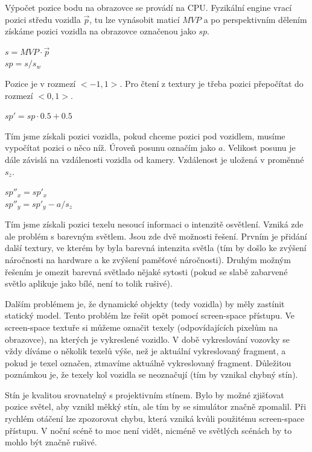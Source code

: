 \documentclass[11pt,twoside,a4paper]{book}
\begin{document}
Výpočet pozice bodu na obrazovce se provádí na CPU. Fyzikální engine vrací pozici středu vozidla $\vec{p}$, tu lze vynásobit maticí $MVP$ a po perspektivním dělením získáme pozici vozidla na obrazovce označenou jako $sp$. 
\begin{center}
$s = MVP \cdot \vec{p}$\\
$sp = s / s_w$
\end{center}
Pozice je v rozmezí $<-1, 1>$. Pro čtení z textury je třeba pozici přepočítat do rozmezí $<0, 1>$.
\begin{center}
$sp' = sp \cdot 0.5 + 0.5$
\end{center}

Tím jsme získali pozici vozidla, pokud chceme pozici pod vozidlem, musíme vypočítat pozici o něco níž. Úroveň posunu označím jako $a$. Velikost posunu je dále závislá na vzdálenosti vozidla od kamery. Vzdálenost je uložená v proměnné $s_z$.
\begin{center}
$sp''_x = sp'_x$\\
$sp''_y = sp'_y - a / s_z$
\end{center}

Tím jsme získali pozici texelu nesoucí informaci o intenzitě osvětlení. Vzniká zde ale problém s barevným světlem. Jsou zde dvě možnosti řešení. Prvním je přidání další textury, ve kterém by byla barevná intenzita světla (tím by došlo ke zvýšení náročnosti na hardware a ke zvýšení paměťové náročnosti). Druhým možným řešením je omezit barevná světla\linebreak do nějaké sytosti (pokud se slabě zabarvené světlo aplikuje jako bílé, není to tolik rušivé).

Dalším problémem je, že dynamické objekty (tedy vozidla) by měly zastínit statický model. Tento problém lze řešit opět pomocí screen-space přístupu. Ve screen-space textuře si můžeme označit texely (odpovídajících pixelům na obrazovce), na kterých je vykreslené vozidlo. V době vykreslování vozovky se vždy díváme o několik texelů výše, než je aktuální vykreslovaný fragment, a pokud je texel označen, ztmavíme aktuálně vykreslovaný fragment. Důležitou poznámkou je, že texely kol vozidla se neoznačují (tím by vznikal chybný stín).

Stín je kvalitou srovnatelný s projektivním stínem. Bylo by možné zjišťovat pozice světel, aby vznikl měkký stín, ale tím by se simulátor značně zpomalil. Při rychlém otáčení lze zpozorovat chybu, která vzniká kvůli použitému screen-space přístupu. V noční scéně to moc není vidět, nicméně ve světlých scénách by to mohlo být značně rušivé.
\end{document}
